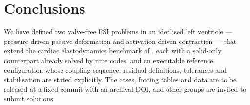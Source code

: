 \section{Conclusions}\label{sec:conclusions}
We have defined two valve-free FSI problems in an idealised left ventricle
--- pressure-driven passive deformation and activation-driven contraction
--- that extend the cardiac elastodynamics benchmark of
\citet{Arostica2025}, each with a solid-only counterpart already solved by
nine codes, and an executable reference configuration whose coupling
sequence, residual definitions, tolerances and stabilisation are stated
explicitly.  The cases,
forcing tables and data are to be released at a fixed commit with an
archival DOI, and other groups are invited to submit solutions.
